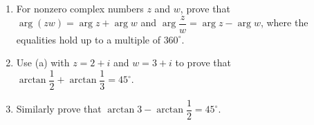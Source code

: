 \begin{enumerate}
\item[(a)] For nonzero complex numbers $z$ and $w$, prove that $\arg(zw)=\arg z+\arg w$ and $\arg\dfrac zw=\arg z-\arg w$, where the equalities hold up to a multiple of $360^\circ$.
\item[(b)] Use (a) with $z=2+i$ and $w=3+i$ to prove that $\arctan\dfrac12+\arctan\dfrac13=45^\circ$.
\item[(c)] Similarly prove that $\arctan3-\arctan\dfrac12=45^\circ$.
\end{enumerate}
